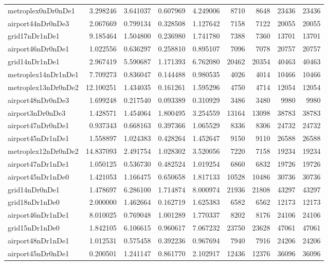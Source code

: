 \begin{longtable}{|l|r|r|r|r|r|r|r|r|}
metroplex0nDr0nDe1 & 3.298246 & 3.641037 & 0.607969 & 4.249006 & 8710 & 8648 & 23436 & 23436 \\
airport44nDr0nDe3 & 2.067669 & 0.799134 & 0.328508 & 1.127642 & 7158 & 7122 & 20055 & 20055 \\
grid17nDr1nDe1 & 9.185464 & 1.504800 & 0.236980 & 1.741780 & 7388 & 7360 & 13701 & 13701 \\
airport46nDr0nDe1 & 1.022556 & 0.636297 & 0.258810 & 0.895107 & 7096 & 7078 & 20757 & 20757 \\
grid14nDr1nDe1 & 2.967419 & 5.590687 & 1.171393 & 6.762080 & 20462 & 20354 & 40463 & 40463 \\
metroplex14nDr1nDe1 & 7.709273 & 0.836047 & 0.144488 & 0.980535 & 4026 & 4014 & 10466 & 10466 \\
metroplex13nDr0nDe2 & 12.100251 & 1.434035 & 0.161261 & 1.595296 & 4750 & 4714 & 12054 & 12054 \\
airport48nDr0nDe3 & 1.699248 & 0.217540 & 0.093389 & 0.310929 & 3486 & 3480 & 9980 & 9980 \\
airport3nDr0nDe3 & 1.428571 & 1.454064 & 1.800495 & 3.254559 & 13164 & 13098 & 38783 & 38783 \\
airport47nDr0nDe1 & 0.937343 & 0.668163 & 0.397366 & 1.065529 & 8336 & 8306 & 24732 & 24732 \\
airport45nDr1nDe1 & 1.558897 & 1.024383 & 0.428264 & 1.452647 & 9150 & 9110 & 26588 & 26588 \\
metroplex12nDr0nDe2 & 14.837093 & 2.491754 & 1.028302 & 3.520056 & 7220 & 7158 & 19234 & 19234 \\
airport47nDr1nDe1 & 1.050125 & 0.536730 & 0.482524 & 1.019254 & 6860 & 6832 & 19726 & 19726 \\
airport45nDr1nDe0 & 1.421053 & 1.166475 & 0.650658 & 1.817133 & 10528 & 10486 & 30736 & 30736 \\
grid14nDr0nDe1 & 1.478697 & 6.286100 & 1.714874 & 8.000974 & 21936 & 21808 & 43297 & 43297 \\
grid18nDr1nDe0 & 2.000000 & 1.462664 & 0.162719 & 1.625383 & 6582 & 6562 & 12173 & 12173 \\
airport46nDr1nDe1 & 8.010025 & 0.769048 & 1.001289 & 1.770337 & 8202 & 8176 & 24106 & 24106 \\
grid15nDr1nDe0 & 1.842105 & 6.106615 & 0.960617 & 7.067232 & 23750 & 23628 & 47061 & 47061 \\
airport48nDr1nDe1 & 1.012531 & 0.575458 & 0.392236 & 0.967694 & 7940 & 7916 & 24206 & 24206 \\
airport45nDr0nDe1 & 0.200501 & 1.241147 & 0.861770 & 2.102917 & 12436 & 12376 & 36096 & 36096 \\

\end{longtable}
